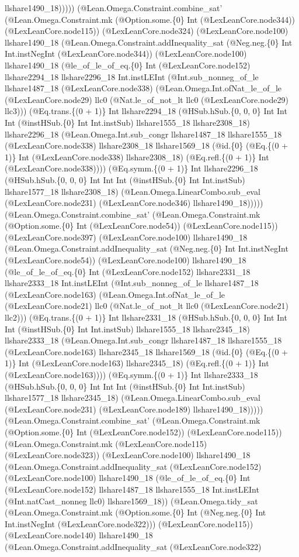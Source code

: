 \documentclass[11pt]{article}
\begin{document}
llshare1490\_18))))) (@Lean.Omega.Constraint.combine\_sat' (@Lean.Omega.Constraint.mk (@Option.some.\{0\} Int (@LexLeanCore.node344)) (@LexLeanCore.node115)) (@LexLeanCore.node324) (@LexLeanCore.node100) llshare1490\_18 (@Lean.Omega.Constraint.addInequality\_sat (@Neg.neg.\{0\} Int Int.instNegInt (@LexLeanCore.node344)) (@LexLeanCore.node100) llshare1490\_18 (@le\_of\_le\_of\_eq.\{0\} Int (@LexLeanCore.node152) llshare2294\_18 llshare2296\_18 Int.instLEInt (@Int.sub\_nonneg\_of\_le llshare1487\_18 (@LexLeanCore.node338) (@Lean.Omega.Int.ofNat\_le\_of\_le (@LexLeanCore.node29) llc0 (@Nat.le\_of\_not\_lt llc0 (@LexLeanCore.node29) llc3))) (@Eq.trans.\{(0 + 1)\} Int llshare2294\_18 (@HSub.hSub.\{0, 0, 0\} Int Int Int (@instHSub.\{0\} Int Int.instSub) llshare1555\_18 llshare2308\_18) llshare2296\_18 (@Lean.Omega.Int.sub\_congr llshare1487\_18 llshare1555\_18 (@LexLeanCore.node338) llshare2308\_18 llshare1569\_18 (@id.\{0\} (@Eq.\{(0 + 1)\} Int (@LexLeanCore.node338) llshare2308\_18) (@Eq.refl.\{(0 + 1)\} Int (@LexLeanCore.node338)))) (@Eq.symm.\{(0 + 1)\} Int llshare2296\_18 (@HSub.hSub.\{0, 0, 0\} Int Int Int (@instHSub.\{0\} Int Int.instSub) llshare1577\_18 llshare2308\_18) (@Lean.Omega.LinearCombo.sub\_eval (@LexLeanCore.node231) (@LexLeanCore.node346) llshare1490\_18))))) (@Lean.Omega.Constraint.combine\_sat' (@Lean.Omega.Constraint.mk (@Option.some.\{0\} Int (@LexLeanCore.node54)) (@LexLeanCore.node115)) (@LexLeanCore.node397) (@LexLeanCore.node100) llshare1490\_18 (@Lean.Omega.Constraint.addInequality\_sat (@Neg.neg.\{0\} Int Int.instNegInt (@LexLeanCore.node54)) (@LexLeanCore.node100) llshare1490\_18 (@le\_of\_le\_of\_eq.\{0\} Int (@LexLeanCore.node152) llshare2331\_18 llshare2333\_18 Int.instLEInt (@Int.sub\_nonneg\_of\_le llshare1487\_18 (@LexLeanCore.node163) (@Lean.Omega.Int.ofNat\_le\_of\_le (@LexLeanCore.node21) llc0 (@Nat.le\_of\_not\_lt llc0 (@LexLeanCore.node21) llc2))) (@Eq.trans.\{(0 + 1)\} Int llshare2331\_18 (@HSub.hSub.\{0, 0, 0\} Int Int Int (@instHSub.\{0\} Int Int.instSub) llshare1555\_18 llshare2345\_18) llshare2333\_18 (@Lean.Omega.Int.sub\_congr llshare1487\_18 llshare1555\_18 (@LexLeanCore.node163) llshare2345\_18 llshare1569\_18 (@id.\{0\} (@Eq.\{(0 + 1)\} Int (@LexLeanCore.node163) llshare2345\_18) (@Eq.refl.\{(0 + 1)\} Int (@LexLeanCore.node163)))) (@Eq.symm.\{(0 + 1)\} Int llshare2333\_18 (@HSub.hSub.\{0, 0, 0\} Int Int Int (@instHSub.\{0\} Int Int.instSub) llshare1577\_18 llshare2345\_18) (@Lean.Omega.LinearCombo.sub\_eval (@LexLeanCore.node231) (@LexLeanCore.node189) llshare1490\_18))))) (@Lean.Omega.Constraint.combine\_sat' (@Lean.Omega.Constraint.mk (@Option.some.\{0\} Int (@LexLeanCore.node152)) (@LexLeanCore.node115)) (@Lean.Omega.Constraint.mk (@LexLeanCore.node115) (@LexLeanCore.node323)) (@LexLeanCore.node100) llshare1490\_18 (@Lean.Omega.Constraint.addInequality\_sat (@LexLeanCore.node152) (@LexLeanCore.node100) llshare1490\_18 (@le\_of\_le\_of\_eq.\{0\} Int (@LexLeanCore.node152) llshare1487\_18 llshare1555\_18 Int.instLEInt (@Int.natCast\_nonneg llc0) llshare1569\_18)) (@Lean.Omega.tidy\_sat (@Lean.Omega.Constraint.mk (@Option.some.\{0\} Int (@Neg.neg.\{0\} Int Int.instNegInt (@LexLeanCore.node322))) (@LexLeanCore.node115)) (@LexLeanCore.node140) llshare1490\_18 (@Lean.Omega.Constraint.addInequality\_sat (@LexLeanCore.node322) 
\end{document}
